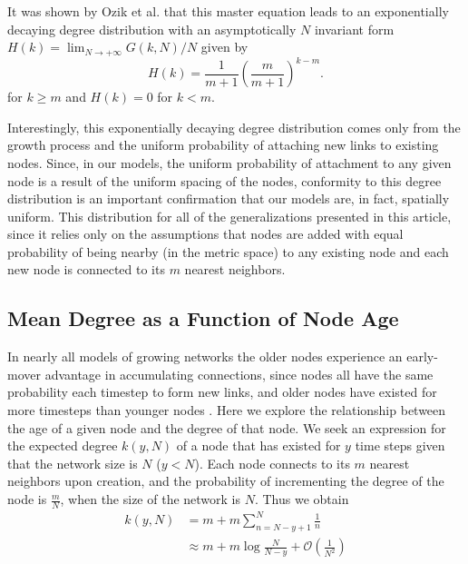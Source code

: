 \documentclass[aps,pre,reprint,superscriptaddress,amsmath,amssymb,nofootinbib]{revtex4-1}
\begin{document}
It was shown by Ozik et al. \cite{ozik2004} that this master equation leads to an exponentially decaying degree distribution with an asymptotically $N$ invariant form $H(k) = \lim_{N \to +\infty} G(k,N)/N$ given by
\begin{equation}
H(k) = \frac{1}{m+1}\left(\frac{m}{m+1}\right)^{k-m}.
\end{equation}
\noindent for $k \geq m$ and $H(k) = 0$ for $k < m$.

Interestingly, this exponentially decaying degree distribution comes only from the growth process and the uniform probability of attaching new links to existing nodes.  
Since, in our models, the uniform probability of attachment to any given node is a result of the uniform spacing of the nodes, conformity to this degree distribution is an important confirmation that our models are, in fact, spatially uniform.
This distribution for all of the generalizations presented in this article, since it relies only on the assumptions that nodes are added with equal probability of being nearby (in the metric space) to any existing node and each new node is connected to its $m$ nearest neighbors.


\subsection{Mean Degree as a Function of Node Age}
In nearly all models of growing networks the older nodes experience an early-mover advantage in accumulating connections, since nodes all have the same probability each timestep to form new links, and older nodes have existed for more timesteps than younger nodes \cite{reallyrandom}.
Here we explore the relationship between the age of a given node and the degree of that node. 
We seek an expression for the expected degree $k(y,N)$ of a node that has existed for $y$ time steps given that the network size is $N$ ($y < N$).
Each node connects to its $m$ nearest neighbors upon creation, and the probability of incrementing the degree of the node is $\frac{m}{N}$, when the size of the network is $N$.
Thus we obtain 
\begin{equation}\label{ageeq}
\begin{split}
k(y,N)& = m + m\sum_{n=N-y+1}^{N} \frac{1}{n}\\
      & \approx m + m \log \frac{N}{N-y} + \mathcal O\left(\frac{1}{N^2}\right)
\end{split}
\end{equation}
 
\end{document}
